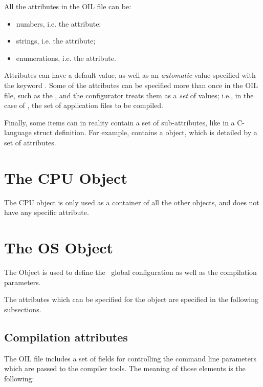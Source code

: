All the attributes in the OIL file can be:

\begin{itemize}
\item numbers, i.e. the  attribute;
\item strings, i.e. the  attribute;
\item enumerations, i.e. the  attribute.
\end{itemize}

Attributes can have a default value, as well as an {\em automatic}
value specified with the keyword . Some of the attributes
can be specified more than once in the OIL file, such as the
, and the configurator treats them as a {\em set} of
values; i.e., in the case of , the set of application
files to be compiled.

Finally, some items can in reality contain a set of sub-attributes,
like in a C-language struct definition. For example, 
contains a  object, which is detailed by a set of
attributes.

\section{The CPU Object}

The CPU object is only used as a container of all the other objects,
and does not have any specific attribute.

\section{The OS Object}

The  Object is used to define the \ee\ global configuration as
well as the compilation parameters.

The attributes which can be specified for the  object are 
specified in the following subsections.

\subsection{Compilation attributes}

The OIL file includes a set of fields for controlling the command line
parameters which are passed to the compiler tools. The meaning of those
elements is the following:

